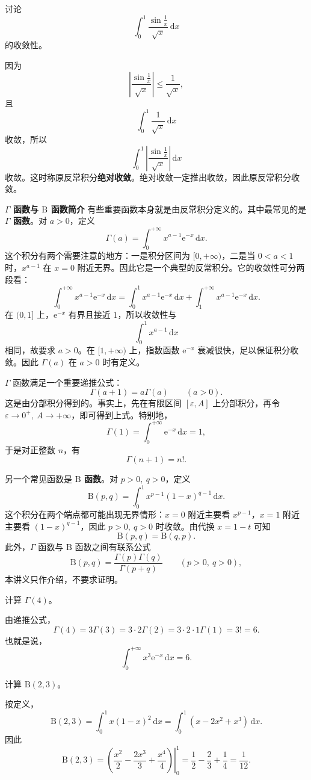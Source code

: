 \documentclass[fontset=fandol]{ctexart}
\newenvironment{custom}[1]{\par\noindent\textbf{#1}\quad}{\par\vspace{0.8em}}
\newcommand{\dd}{\mathrm{d}}
\newcommand{\ee}{\mathrm{e}}
\begin{document}
\begin{example}[无界点附近的比较]
讨论
\[
\int_0^1\frac{\sin\frac1x}{\sqrt{x}}\,\dd x
\]
的收敛性。

因为
\[
\left|\frac{\sin\frac1x}{\sqrt{x}}\right|\leq\frac1{\sqrt{x}},
\]
且
\[
\int_0^1\frac1{\sqrt{x}}\,\dd x
\]
收敛，所以
\[
\int_0^1\left|\frac{\sin\frac1x}{\sqrt{x}}\right|\,\dd x
\]
收敛。这时称原反常积分\textbf{绝对收敛}。绝对收敛一定推出收敛，因此原反常积分收敛。
\end{example}

\begin{custom}{$\Gamma$ 函数与 $\mathrm B$ 函数简介}
有些重要函数本身就是由反常积分定义的。其中最常见的是 \textbf{$\Gamma$ 函数}。对 $a>0$，定义
\[
\Gamma(a)=\int_0^{+\infty}x^{a-1}\ee^{-x}\,\dd x.
\]
这个积分有两个需要注意的地方：一是积分区间为 $[0,+\infty)$，二是当 $0<a<1$ 时，$x^{a-1}$ 在 $x=0$ 附近无界。因此它是一个典型的反常积分。它的收敛性可分两段看：
\[
\int_0^{+\infty}x^{a-1}\ee^{-x}\,\dd x
=\int_0^1x^{a-1}\ee^{-x}\,\dd x+\int_1^{+\infty}x^{a-1}\ee^{-x}\,\dd x.
\]
在 $(0,1]$ 上，$\ee^{-x}$ 有界且接近 $1$，所以收敛性与
\[
\int_0^1x^{a-1}\,\dd x
\]
相同，故要求 $a>0$。在 $[1,+\infty)$ 上，指数函数 $\ee^{-x}$ 衰减很快，足以保证积分收敛。因此 $\Gamma(a)$ 在 $a>0$ 时有定义。

$\Gamma$ 函数满足一个重要递推公式：
\[
\Gamma(a+1)=a\Gamma(a)\qquad(a>0).
\]
这是由分部积分得到的。事实上，先在有限区间 $[\varepsilon,A]$ 上分部积分，再令 $\varepsilon\to0^+,\ A\to+\infty$，即可得到上式。特别地，
\[
\Gamma(1)=\int_0^{+\infty}\ee^{-x}\,\dd x=1,
\]
于是对正整数 $n$，有
\[
\Gamma(n+1)=n!.
\]

另一个常见函数是 \textbf{$\mathrm B$ 函数}。对 $p>0,\ q>0$，定义
\[
\mathrm B(p,q)=\int_0^1x^{p-1}(1-x)^{q-1}\,\dd x.
\]
这个积分在两个端点都可能出现无界情形：$x=0$ 附近主要看 $x^{p-1}$，$x=1$ 附近主要看 $(1-x)^{q-1}$，因此 $p>0,\ q>0$ 时收敛。由代换 $x=1-t$ 可知
\[
\mathrm B(p,q)=\mathrm B(q,p).
\]
此外，$\Gamma$ 函数与 $\mathrm B$ 函数之间有联系公式
\[
\mathrm B(p,q)=\frac{\Gamma(p)\Gamma(q)}{\Gamma(p+q)}\qquad(p>0,\ q>0),
\]
本讲义只作介绍，不要求证明。
\end{custom}

\begin{example}
计算 $\Gamma(4)$。

由递推公式，
\[
\Gamma(4)=3\Gamma(3)=3\cdot2\Gamma(2)=3\cdot2\cdot1\Gamma(1)=3!=6.
\]
也就是说，
\[
\int_0^{+\infty}x^3\ee^{-x}\,\dd x=6.
\]
\end{example}

\begin{example}
计算 $\mathrm B(2,3)$。

按定义，
\[
\mathrm B(2,3)=\int_0^1x(1-x)^2\,\dd x
=\int_0^1(x-2x^2+x^3)\,\dd x.
\]
因此
\[
\mathrm B(2,3)=\left.\left(\frac{x^2}{2}-\frac{2x^3}{3}+\frac{x^4}{4}\right)\right|_0^1
=\frac12-\frac23+\frac14=\frac1{12}.
\]
\end{example}
\end{document}
